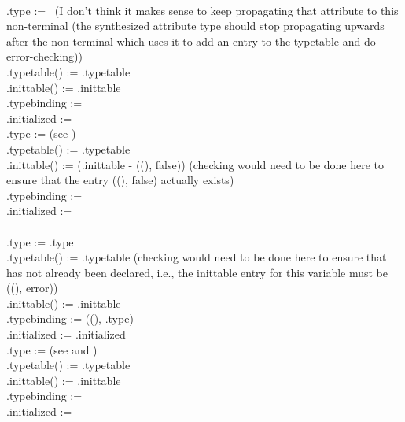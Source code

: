 \documentclass{article}
\begin{document}
\begin{enumerate}
{\it {} \rarrow {}}\\
.type := \na\ (I don't think it makes sense to keep propagating that attribute to this non-terminal (the synthesized attribute type should stop propagating upwards after the non-terminal which uses it to add an entry to the typetable and do error-checking))\\
.typetable() := .typetable\\
.inittable() := .inittable\\
.typebinding := \na\\
.initialized := \na\\

.type := (see )\\
.typetable() := .typetable\\
.inittable() := (.inittable - {((), false)})  
(checking would need to be done here to ensure that the entry
((), false) actually exists)\\
.typebinding := \na\\
.initialized := \na\\

{\it {} \rarrow {} }\\
.type := .type\\
.typetable() := .typetable 
(checking would need to be done here to ensure that  
has not already been declared, i.e., the inittable entry 
for this variable must be ((), error))\\
.inittable() := .inittable \\
.typebinding := ((), .type)\\
.initialized := .initialized\\

.type := (see  and )\\
.typetable() := .typetable\\
.inittable() := .inittable\\
.typebinding := \na\\
.initialized := \na\\


\end{enumerate}
\end{document}
